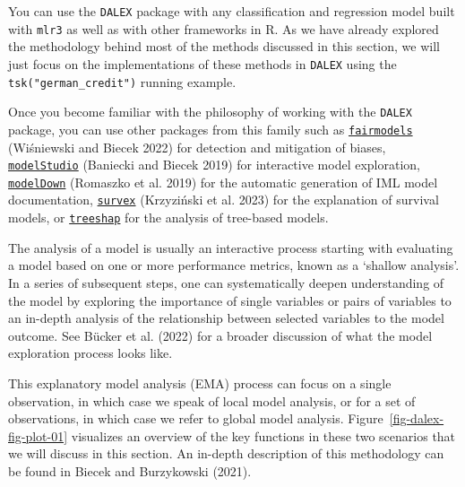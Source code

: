 You can use the \texttt{DALEX} package with any classification and
regression model built with \texttt{mlr3} as well as with other
frameworks in R. As we have already explored the methodology behind most
of the methods discussed in this section, we will just focus on the
implementations of these methods in \texttt{DALEX} using the
\texttt{tsk("german\_credit")} running example.

Once you become familiar with the philosophy of working with the
\texttt{DALEX} package, you can use other packages from this family such
as
\href{https://cran.r-project.org/package=fairmodels}{\texttt{fairmodels}}
(Wiśniewski and Biecek 2022) for detection and mitigation of biases,
\href{https://cran.r-project.org/package=modelStudio}{\texttt{modelStudio}}
(Baniecki and Biecek 2019) for interactive model exploration,
\href{https://cran.r-project.org/package=modelDown}{\texttt{modelDown}}
(Romaszko et al. 2019) for the automatic generation of IML model
documentation,
\href{https://cran.r-project.org/package=survex}{\texttt{survex}}
(Krzyziński et al. 2023) for the explanation of survival models, or
\href{https://cran.r-project.org/package=treeshap}{\texttt{treeshap}}
for the analysis of tree-based models.

The analysis of a model is usually an interactive process starting with
evaluating a model based on one or more performance metrics, known as a
`shallow analysis'. In a series of subsequent steps, one can
systematically deepen understanding of the model by exploring the
importance of single variables or pairs of variables to an in-depth
analysis of the relationship between selected variables to the model
outcome. See Bücker et al. (2022) for a broader discussion of what the
model exploration process looks like.

This explanatory model
analysis (EMA) process can focus on a single
observation, in which case we speak of local model analysis, or for a
set of observations, in which case we refer to global model analysis.
Figure~\ref{fig-dalex-fig-plot-01} visualizes an overview of the key
functions in these two scenarios that we will discuss in this section.
An in-depth description of this methodology can be found in Biecek and
Burzykowski (2021).

